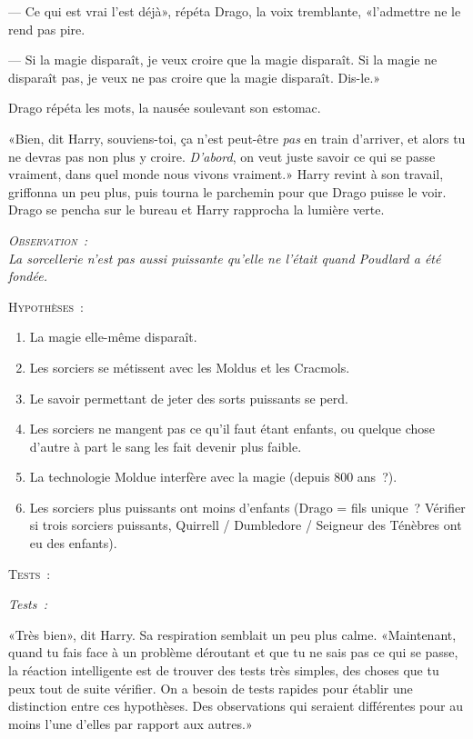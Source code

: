 --- Ce qui est vrai l'est déjà», répéta Drago, la voix tremblante, «l'admettre ne le rend pas pire.

--- Si la magie disparaît, je veux croire que la magie disparaît. Si la magie ne disparaît pas, je veux ne pas croire que la magie disparaît. Dis-le.»

Drago répéta les mots, la nausée soulevant son estomac.

«Bien, dit Harry, souviens-toi, ça n'est peut-être \emph{pas} en train d'arriver, et alors tu ne devras pas non plus y croire. \emph{D'abord}, on veut juste savoir ce qui se passe vraiment, dans quel monde nous vivons vraiment.» Harry revint à son travail, griffonna un peu plus, puis tourna le parchemin pour que Drago puisse le voir. Drago se pencha sur le bureau et Harry rapprocha la lumière verte.

\begin{center}\itshape
{\scshape Observation~:}\\
La sorcellerie n'est pas aussi puissante qu'elle ne l'était quand Poudlard a été fondée. 

{\scshape Hypothèses~:}
\begin{enumerate}[1.]\firmlist
\item La magie elle-même disparaît.
\item Les sorciers se métissent avec les Moldus et les Cracmols.
\item Le savoir permettant de jeter des sorts puissants se perd.
\item Les sorciers ne mangent pas ce qu'il faut étant enfants, ou quelque chose d'autre à part le sang les fait devenir plus faible.
\item La technologie Moldue interfère avec la magie (depuis 800 ans~?).
\item Les sorciers plus puissants ont moins d'enfants (Drago = fils unique~? Vérifier si trois sorciers puissants, Quirrell / Dumbledore / Seigneur des Ténèbres ont eu des enfants). \end{enumerate} {\scshape Tests~:} \end{center}

\emph{{Tests~:}}

«Très bien», dit Harry. Sa respiration semblait un peu plus calme. «Maintenant, quand tu fais face à un problème déroutant et que tu ne sais pas ce qui se passe, la réaction intelligente est de trouver des tests très simples, des choses que tu peux tout de suite vérifier. On a besoin de tests rapides pour établir une distinction entre ces hypothèses. Des observations qui seraient différentes pour au moins l'une d'elles par rapport aux autres.»

